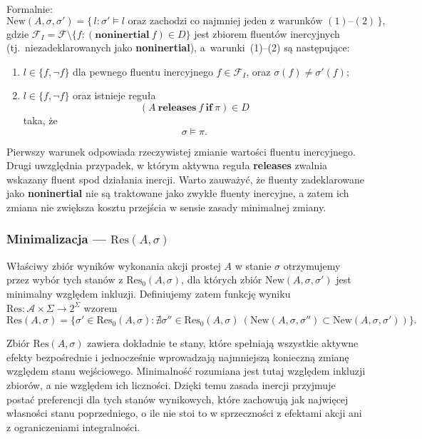 \documentclass[11pt,a4paper]{article}
\newcommand{\noninertial}{\textbf{noninertial}}
\theoremstyle{definition}
\begin{document}
Formalnie:
\[
\mathrm{New}(A,\sigma,\sigma')=
\{\, l : \sigma' \models l \text{ oraz zachodzi co najmniej jeden z warunków } (1)\text{--}(2)\,\},
\]
gdzie $\mathcal{F}_I = \mathcal{F} \setminus \{f : (\noninertial{}\ f)\in D\}$ jest zbiorem fluentów inercyjnych (tj.\ niezadeklarowanych jako \noninertial{}), a~warunki~(1)--(2) są następujące:
\begin{enumerate}
    \item $l \in \{f, \neg f\}$ dla pewnego fluentu inercyjnego $f \in \mathcal{F}_I$, oraz $\sigma(f)\neq \sigma'(f)$;
    \item $l \in \{f, \neg f\}$ oraz istnieje reguła
    \[
    (A\ \textbf{releases}\ f\ \textbf{if}\ \pi)\in D
    \]
    taka, że
    \[
    \sigma \models \pi.
    \]
\end{enumerate}

Pierwszy warunek odpowiada rzeczywistej zmianie wartości fluentu inercyjnego. Drugi uwzględnia przypadek, w którym aktywna reguła \textbf{releases} zwalnia wskazany fluent spod działania inercji. Warto zauważyć, że fluenty zadeklarowane jako \textbf{noninertial} nie są traktowane jako zwykłe fluenty inercyjne, a zatem ich zmiana nie zwiększa kosztu przejścia w sensie zasady minimalnej zmiany.

\subsubsection{Minimalizacja --- \texorpdfstring{$\mathrm{Res}(A, \sigma)$}{Res(A,sigma)}}
\label{sec:minimalizacja}

Właściwy zbiór wyników wykonania akcji prostej $A$ w stanie $\sigma$ otrzymujemy przez wybór tych stanów z $\mathrm{Res}_0(A,\sigma)$, dla których zbiór $\mathrm{New}(A,\sigma,\sigma')$ jest minimalny względem inkluzji. Definiujemy zatem funkcję wyniku $\mathrm{Res} : \mathcal{A} \times \Sigma \to 2^{\Sigma}$ wzorem
\[
\mathrm{Res}(A,\sigma)=
\{\sigma' \in \mathrm{Res}_0(A,\sigma) :
\nexists \sigma'' \in \mathrm{Res}_0(A,\sigma)\ 
(\mathrm{New}(A,\sigma,\sigma'') \subset \mathrm{New}(A,\sigma,\sigma'))\}.
\]

Zbiór $\mathrm{Res}(A,\sigma)$ zawiera dokładnie te stany, które spełniają wszystkie aktywne efekty bezpośrednie i jednocześnie wprowadzają najmniejszą konieczną zmianę względem stanu wejściowego. Minimalność rozumiana jest tutaj względem inkluzji zbiorów, a nie względem ich liczności. Dzięki temu zasada inercji przyjmuje postać preferencji dla tych stanów wynikowych, które zachowują jak najwięcej własności stanu poprzedniego, o ile nie stoi to w sprzeczności z efektami akcji ani z ograniczeniami integralności.
\end{document}
